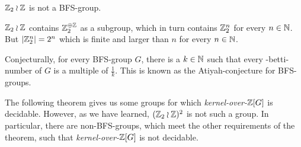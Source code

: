 \begin{Example}
	$\mathbb{Z}_2 \wr \mathbb{Z}$ is not a BFS-group.
\end{Example}
\proof
	$\mathbb{Z}_2 \wr \mathbb{Z}$ contains $\mathbb{Z}_2^{\oplus \mathbb{Z}}$ as a subgroup, which in turn contains $\mathbb{Z}_2^n$ for every $n \in \mathbb{N}$.
	But $|\mathbb{Z}_2^n| = 2^n$ which is finite and larger than $n$ for every $n \in \mathbb{N}$.
\endproof

Conjecturally, for every BFS-group $G$, there is a $k \in \mathbb{N}$ such that every \ltwo-betti-number of $G$ is a multiple of $\frac1k$.
This is known as the Atiyah-conjecture for BFS-groups.\footnotemark
{}

The following theorem gives us some groups for which \emph{kernel-over-$\mathbb{Z}[G]$} is decidable.
However, as we have learned, $(\mathbb{Z}_2 \wr \mathbb{Z})^2$ is not such a group.
In particular, there are non-BFS-groups, which meet the other requirements of the theorem, such that \emph{kernel-over-$\mathbb{Z}[G]$} is not decidable.

